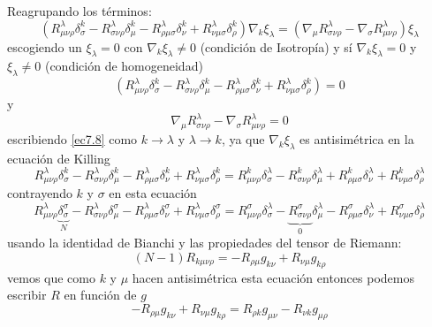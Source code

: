 \documentclass[../main]{subfiles}
\begin{document}
Reagrupando los términos:
\begin{equation}
    (R^{\lambda}_{\mu\nu\rho}\delta^k_{\sigma}-R^{\lambda}_{\sigma\nu\rho}\delta^k_{\mu}-R^{\lambda}_{\rho\mu\sigma}\delta^k_{\nu}+R^{\lambda}_{\nu\mu\sigma}\delta^k_{\rho})\nabla_k \xi_{\lambda}=(\nabla_{\mu}R^{\lambda}_{\sigma\nu\rho}-\nabla_{\sigma}R^{\lambda}_{\mu\nu\rho})\xi_{\lambda}
\end{equation}
escogiendo un $\xi_{\lambda}=0$ con $\nabla_k \xi_{\lambda} \neq 0$ (condición de Isotropía) y sí $\nabla_k \xi_{\lambda}=0$ y $\xi_{\lambda} \neq 0$ (condición de homogeneidad)
\begin{equation}
    (R^{\lambda}_{\mu\nu\rho}\delta^k_{\sigma}-R^{\lambda}_{\sigma\nu\rho}\delta^k_{\mu}-R^{\lambda}_{\rho\mu\sigma}\delta^k_{\nu}+R^{\lambda}_{\nu\mu\sigma}\delta^k_{\rho})=0
    \label{ec7.8}
\end{equation}
y
\begin{equation}
    \nabla_{\mu}R^{\lambda}_{\sigma\nu\rho}-\nabla_{\sigma}R^{\lambda}_{\mu\nu\rho}=0
\end{equation}
escribiendo \eqref{ec7.8} como $k\rightarrow \lambda$ y $\lambda\rightarrow k$, ya que $\nabla_k \xi_{\lambda}$ es antisimétrica en la ecuación de Killing
\begin{equation}
    R^{\lambda}_{\mu\nu\rho}\delta^k_{\sigma}-R^{\lambda}_{\sigma\nu\rho}\delta^k_{\mu}-R^{\lambda}_{\rho\mu\sigma}\delta^k_{\nu}+R^{\lambda}_{\nu\mu\sigma}\delta^k_{\rho}=R^k_{\mu\nu\rho}\delta^{\lambda}_{\sigma}-R^k_{\sigma\nu\rho}\delta^{\lambda}_{\mu}+R^k_{\rho\mu\sigma}\delta^{\lambda}_{\nu}+R^k_{\nu\mu\sigma}\delta^{\lambda}_{\rho}
\end{equation}
contrayendo $k$ y $\sigma$ en esta ecuación
\begin{equation}
    R^{\lambda}_{\mu\nu\rho}\underbrace{\delta^{\sigma}_{\sigma}}_{N}-R^{\lambda}_{\sigma\nu\rho}\delta^{\sigma}_{\mu}-R^{\lambda}_{\rho\mu\sigma}\delta^{\sigma}_{\nu}+R^{\lambda}_{\nu\mu\sigma}\delta^{\sigma}_{\rho}=R^{\sigma}_{\mu\nu\rho}\delta^{\lambda}_{\sigma}-\underbrace{R^{\sigma}_{\sigma\nu\rho}}_{0}\delta^{\lambda}_{\mu}-R^{\sigma}_{\rho\mu\sigma}\delta^{\lambda}_{\nu}+R^{\sigma}_{\nu\mu\sigma}\delta^{\lambda}_{\rho}
\end{equation}
usando la identidad de Bianchi y las propiedades del tensor de Riemann:
\begin{equation}
    (N-1)R_{k\mu\nu\rho}=-R_{\rho\mu}g_{k\nu}+R_{\nu\mu}g_{k\rho}
    \label{ec7.12}
\end{equation}
vemos que como $k$ y $\mu$ hacen antisimétrica esta ecuación entonces podemos escribir $R$ en función de $g$
\begin{equation}
    -R_{\rho\mu}g_{k\nu}+R_{\nu\mu}g_{k\rho}=R_{\rho k}g_{\mu\nu}-R_{\nu k}g_{\mu\rho}
\end{equation}
\end{document}
